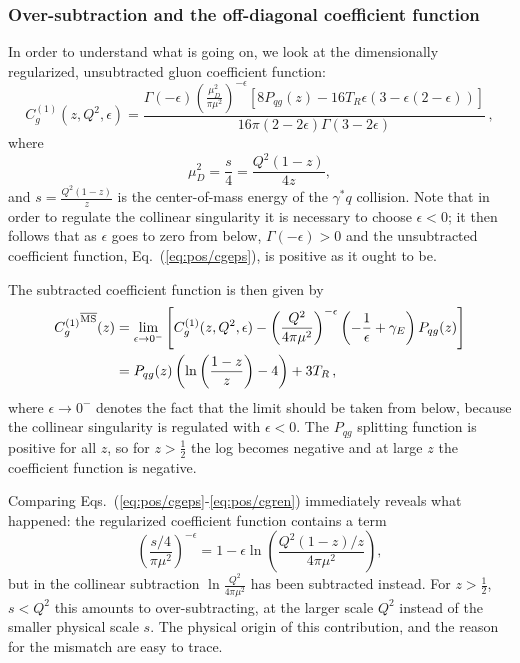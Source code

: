  
\subsubsection{Over-subtraction and the off-diagonal coefficient function}
\label{sec:offdiag}

In order to understand what is going on, we look at the dimensionally
regularized, unsubtracted gluon coefficient function:
\begin{equation}\label{eq:pos/cgeps}
C^{(1)}_{g}(z,Q^2,\epsilon) = \frac{ \Gamma(-\epsilon)
  \left(\frac{\mu_D^2}{\pi\mu^2}\right)^{-\epsilon} \left[8P_{qg}(z)-16 T_R \epsilon (3
    -\epsilon(2 -\epsilon) )  \right]  }{16\pi (2 - 2\epsilon) \Gamma (3 - 2 \epsilon)}\,,
\end{equation}
where
\begin{equation}\label{eq:pos/mud}
  \mu_D^2=\frac{s}{4}=\frac{Q^2(1-z)}{4z},
\end{equation} 
and  $s=\frac{Q^2(1-z)}{z}$ is the center-of-mass energy of the
$\gamma^* q$ collision. 
Note that in order to regulate the collinear singularity it is
necessary to choose $\epsilon<0$; it then follows that  as $\epsilon$
goes to zero from below,
$\Gamma(-\epsilon)>0$ and
the unsubtracted coefficient function, Eq.~(\ref{eq:pos/cgeps}), is positive as it ought to
be.

The subtracted \msbar{} coefficient function is then given by
\begin{align}\label{eq:pos/cgren}
{C^{(1)}_{g}}^{{\overline{\textrm{MS}}}}(z) &= \lim_{\epsilon\to
  0^-}\left[C_{g}^{(1)}(z,Q^2,\epsilon) - \left(\frac{Q^2}{4\pi
      \mu^2}\right)^{-\epsilon} \left(-\frac 1
    {\epsilon}+\gamma_E\right) P_{qg}(z)\right]\\
    &= P_{qg}(z) \left( \ln\left(\frac{1-z}{z}\right) - 4 \right) + 3
    T_R \, ,\label{eq:pos/cgnlo}
\end{align}
where  $\epsilon\to 0^-$ denotes the fact that the limit should be
taken from below, because the collinear singularity is regulated with
$\epsilon<0$. 
The $P_{qg}$ splitting function is positive for all $z$, so for
$z>\frac{1}{2}$ the log  becomes negative and at large $z$ the
coefficient function is negative.


Comparing  Eqs.~(\ref{eq:pos/cgeps}-\ref{eq:pos/cgren}) immediately reveals
what happened:  the regularized coefficient function contains a term
\begin{equation}\label{eq:pos/logexp}
  \left(\frac{s/4}{\pi\mu^2}\right)^{-\epsilon}=1-\epsilon \ln \left(\frac{Q^2(1-z)/z}{4\pi\mu^2}\right),
\end{equation}
but in the collinear subtraction $\ln \frac{Q^2}{4\pi\mu^2}$ has been
subtracted instead. For $z>\frac{1}{2}$, $s<Q^2$ this
amounts to over-subtracting, at the larger scale $Q^2$ instead of the
smaller physical scale $s$. The physical origin of this contribution,
and the reason for the mismatch are easy to trace.

